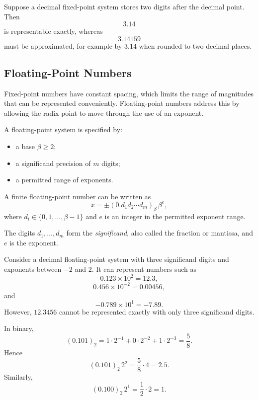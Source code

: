 \begin{example}
  Suppose a decimal fixed-point system stores two digits after the decimal point. Then
  \[
    3.14
  \]
  is representable exactly, whereas
  \[
    3.14159
  \]
  must be approximated, for example by \(3.14\) when rounded to two decimal places.
\end{example}

\subsection{Floating-Point Numbers}

Fixed-point numbers have constant spacing, which limits the range of magnitudes that can be represented conveniently. Floating-point numbers address this by allowing the radix point to move through the use of an exponent.

\begin{definition}
  A floating-point system is specified by:
  \begin{itemize}
    \item a base \(\beta\geq2\);
    \item a significand precision of \(m\) digits;
    \item a permitted range of exponents.
  \end{itemize}
  A finite floating-point number can be written as
  \[
    \boxed{
      x=\pm(0.d_1d_2\cdots d_m)_\beta\,\beta^e,
    }
  \]
  where \(d_i\in\{0,1,\ldots,\beta-1\}\) and \(e\) is an integer in the permitted exponent range.

  The digits \(d_1,\ldots,d_m\) form the \emph{significand}, also called the fraction or mantissa, and \(e\) is the exponent.
\end{definition}

\begin{example}
  Consider a decimal floating-point system with three significand digits and exponents between \(-2\) and \(2\). It can represent numbers such as
  \[
    0.123\times10^2=12.3,
  \]
  \[
    0.456\times10^{-2}=0.00456,
  \]
  and
  \[
    -0.789\times10^1=-7.89.
  \]
  However, \(12.3456\) cannot be represented exactly with only three significand digits.
\end{example}

\begin{example}
  In binary,
  \[
    (0.101)_2
    =1\cdot2^{-1}+0\cdot2^{-2}+1\cdot2^{-3}
    =\frac{5}{8}.
  \]
  Hence
  \[
    (0.101)_2\,2^2=\frac58\cdot4=2.5.
  \]
  Similarly,
  \[
    (0.100)_2\,2^1=\frac12\cdot2=1.
  \]
\end{example}

